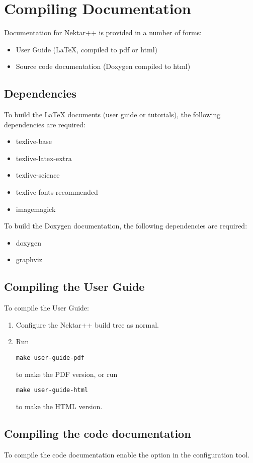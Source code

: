 \section{Compiling Documentation}
Documentation for Nektar++ is provided in a number of forms:
\begin{itemize}
\item User Guide (LaTeX, compiled to pdf or html)
\item Source code documentation (Doxygen compiled to html)
\end{itemize}

\subsection{Dependencies}
To build the LaTeX documents (user guide or tutorials), the following
dependencies are required:
\begin{itemize}
\item texlive-base
\item texlive-latex-extra
\item texlive-science
\item texlive-fonts-recommended
\item imagemagick
\end{itemize}

To build the Doxygen documentation, the following dependencies are required:
\begin{itemize}
\item doxygen
\item graphviz
\end{itemize}

\subsection{Compiling the User Guide}
To compile the User Guide:
\begin{enumerate}
\item Configure the Nektar++ build tree as normal.
\item Run
    \begin{lstlisting}[style=BashInputStyle]
make user-guide-pdf
\end{lstlisting}
to make the PDF version, or run
\begin{lstlisting}[style=BashInputStyle]
make user-guide-html
\end{lstlisting}
to make the HTML version.
\end{enumerate}

\subsection{Compiling the code documentation}
To compile the code documentation enable the  option
in the  configuration tool.

